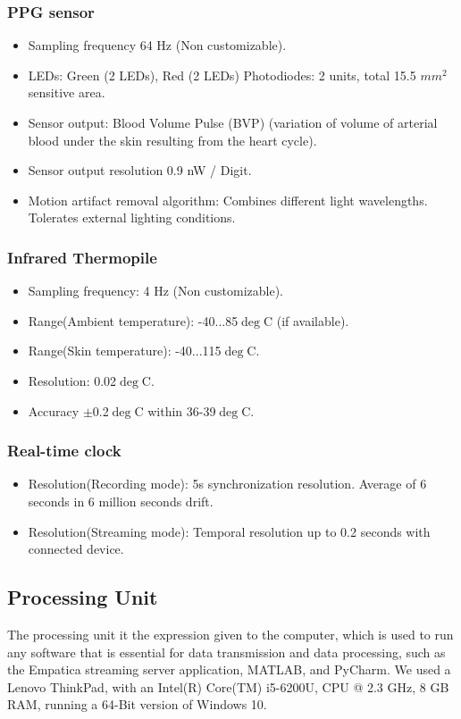 \subsubsection{PPG sensor}
\begin{itemize}
\item Sampling frequency 64 Hz (Non customizable).
\item LEDs: Green (2 LEDs), Red (2 LEDs) Photodiodes: 2
units, total 15.5 $mm^{2}$ sensitive area.
\item Sensor output: Blood Volume Pulse (BVP) (variation
of volume of arterial blood under the skin resulting
from the heart cycle).
\item Sensor output resolution 0.9 nW / Digit.
\item Motion artifact removal algorithm: Combines different light wavelengths. Tolerates external lighting conditions.
\end{itemize}
\newpage
\subsubsection{Infrared Thermopile}
\begin{itemize}
\item Sampling frequency: 4 Hz (Non customizable).
\item Range(Ambient temperature): -40...85$\deg$C (if available).
\item Range(Skin temperature): -40...115$\deg$C.
\item Resolution: 0.02$\deg$C.
\item Accuracy $\pm$0.2$\deg$C within 36-39$\deg$C.
\end{itemize}

\subsubsection{Real-time clock}
\begin{itemize}
\item Resolution(Recording mode): 5s synchronization resolution. Average of 6 seconds in 6 million seconds drift.
\item Resolution(Streaming mode): Temporal resolution up to 0.2 seconds with connected device.
\end{itemize}

\subsection{Processing Unit}
The processing unit it the expression given to the computer, which is used to run any software that is essential for data transmission and data processing, such as the Empatica streaming server application, MATLAB, and PyCharm. We used a Lenovo ThinkPad, with an Intel(R) Core(TM) i5-6200U, CPU @ 2.3 GHz, 8 GB RAM, running a 64-Bit version of Windows 10. 

